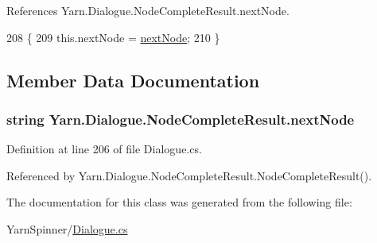 References Yarn.\-Dialogue.\-Node\-Complete\-Result.\-next\-Node.


\begin{DoxyCode}
208                                                         \{
209                 this.nextNode = \hyperlink{a00132_ad48b37b51066b94cd48c58626ac0e774}{nextNode};
210             \}
\end{DoxyCode}


\subsection{Member Data Documentation}
\hypertarget{a00132_ad48b37b51066b94cd48c58626ac0e774}{
\subsubsection[{next\-Node}]{\setlength{\rightskip}{0pt plus 5cm}string Yarn.\-Dialogue.\-Node\-Complete\-Result.\-next\-Node}}\label{a00132_ad48b37b51066b94cd48c58626ac0e774}


Definition at line 206 of file Dialogue.\-cs.



Referenced by Yarn.\-Dialogue.\-Node\-Complete\-Result.\-Node\-Complete\-Result().



The documentation for this class was generated from the following file\-:\begin{DoxyCompactItemize}
\item 
Yarn\-Spinner/\hyperlink{a00285}{Dialogue.\-cs}\end{DoxyCompactItemize}
